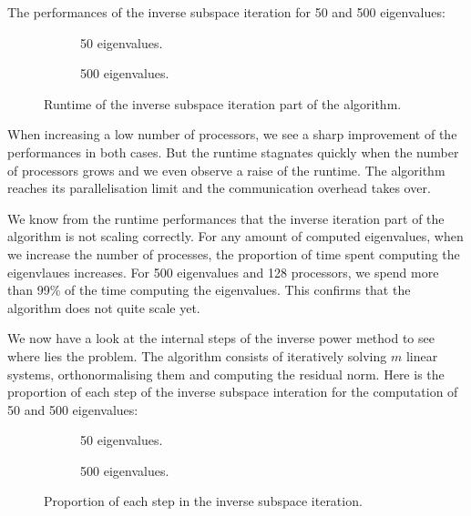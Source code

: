 The performances of the inverse subspace iteration for 50 and 500 eigenvalues:

\begin{figure}[H]
  \centering
  \begin{subfigure}[b]{0.5\textwidth}
   
   \caption{50 eigenvalues.}
  \end{subfigure}
  \begin{subfigure}[b]{0.45\textwidth}
   
   \caption{500 eigenvalues.}
  \end{subfigure}
  \caption{Runtime of the inverse subspace iteration part of the algorithm.}
\end{figure}

When increasing a low number of processors, we see a sharp improvement of the performances in both cases.
But the runtime stagnates quickly when the number of processors grows and we even observe a raise of the runtime.
The algorithm reaches its parallelisation limit and the communication overhead takes over.

We know from the runtime performances that the inverse iteration part of the algorithm is not scaling correctly.
For any amount of computed eigenvalues, when we increase the number of processes, the proportion of time spent computing the eigenvlaues increases.
For 500 eigenvalues and 128 processors, we spend more than 99\% of the time computing the eigenvalues.
This confirms that the algorithm does not quite scale yet.

We now have a look at the internal steps of the inverse power method to see where lies the problem.
The algorithm consists of iteratively solving \(m\) linear systems, orthonormalising them and computing the residual norm.
Here is the proportion of each step of the inverse subspace interation for the computation of 50 and 500 eigenvalues:

\begin{figure}[H]
  \centering
  \begin{subfigure}[b]{0.4\textwidth}
   
   \caption{50 eigenvalues.}
  \end{subfigure}
  \begin{subfigure}[b]{0.4\textwidth}
   
   \caption{500 eigenvalues.}
  \end{subfigure}
  \caption{Proportion of each step in the inverse subspace iteration.}
\end{figure}

